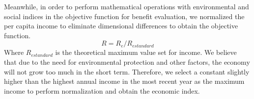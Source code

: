\documentclass[12pt]{article}  %
\begin{document}
Meanwhile, in order to perform mathematical operations with environmental and social indices in the objective function for benefit evaluation, we normalized the per capita income to eliminate dimensional differences to obtain the objective function.
\begin{equation}
    R = R_{e}/R_{estandard}
\end{equation}
Where $R_{estandard}$ is the theoretical maximum value set for income. We believe that due to the need for environmental protection and other factors, the economy will not grow too much in the short term. Therefore, we select a constant slightly higher than the highest annual income in the most recent year as the maximum income to perform normalization and obtain the economic index.
\end{document}
